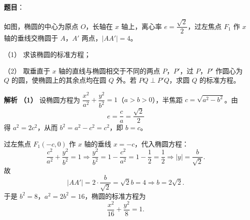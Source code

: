 \begin{answer}

\textbf{题目}：

如图，椭圆的中心为原点 $O$，长轴在 $x$ 轴上，离心率 $e=\dfrac{\sqrt2}2$，过左焦点 $F_1$ 作 $x$ 轴的垂线交椭圆于 $A$，$A'$ 两点，$|AA'|=4$。

（1） 求该椭圆的标准方程；

（2） 取垂直于 $x$ 轴的直线与椭圆相交于不同的两点 $P$，$P'$，过 $P$，$P'$ 作圆心为 $Q$ 的圆，使椭圆上的其余点均在圆 $Q$ 外。若 $PQ\perp P'Q$，求圆 $Q$ 的标准方程。
\nopagebreak[4]
\begin{center}\end{center}
\nopagebreak[4]
\textbf{解析}
\textbf{（1）} 设椭圆方程为 $\dfrac{x^2}{a^2}+\dfrac{y^2}{b^2}=1$（$a>b>0$），半焦距 $c=\sqrt{a^2-b^2}$。由
\nopagebreak[4]
\[e=\frac ca=\frac{\sqrt2}2\]
得 $a^2=2c^2$，从而 $b^2=a^2-c^2=c^2$，即 $b=c$。

过左焦点 $F_1(-c,0)$ 作 $x$ 轴的垂线 $x=-c$，代入椭圆方程：
\nopagebreak[4]
\[\frac{c^2}{a^2}+\frac{y^2}{b^2}=1
\Longrightarrow\frac{y^2}{b^2}=1-\frac{c^2}{a^2}=1-\frac12=\frac12
\Longrightarrow|y|=\frac{b}{\sqrt2}.\]
故
\nopagebreak[4]
\[|AA'|=2\cdot\frac b{\sqrt2}=\sqrt2b=4\Longrightarrow b=2\sqrt2.\]
于是 $b^2=8$，$a^2=2b^2=16$，椭圆的标准方程为
\nopagebreak[4]
\[\frac{x^2}{16}+\frac{y^2}8=1.\]


\end{answer}
